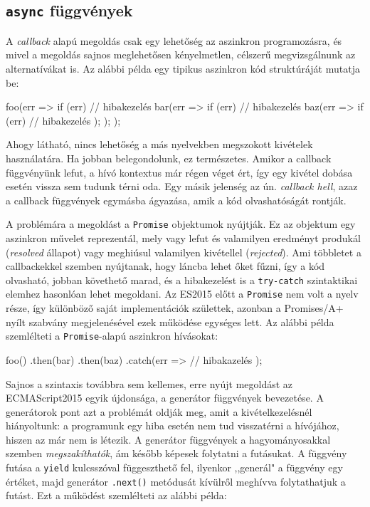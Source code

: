 \subsection{\texttt{async} függvények}\label{sec:async}

A \emph{callback} alapú megoldás csak egy lehetőség az aszinkron programozásra,
és mivel a megoldás sajnos meglehetősen kényelmetlen, célszerű megvizsgálnunk az
alternatívákat is. Az alábbi példa egy tipikus aszinkron kód struktúráját
mutatja be:

\begin{js}
foo(err => {
  if (err) {
    // hibakezelés
  }
  bar(err => {
    if (err) {
      // hibakezelés
    }
    baz(err => {
      if (err) {
        // hibakezelés
      }
    });
  });
});
\end{js}

Ahogy látható, nincs lehetőség a más nyelvekben megszokott kivételek
használatára.  Ha jobban belegondolunk, ez természetes. Amikor a callback
függvényünk lefut, a hívó kontextus már régen véget ért, így egy kivétel dobása
esetén vissza sem tudunk térni oda. Egy másik jelenség az ún. \emph{callback
  hell}, azaz a callback függvények egymásba ágyazása, amik a kód olvashatóságát
rontják.

A problémára a megoldást a \texttt{Promise} objektumok nyújtják.  Ez az objektum
egy aszinkron művelet reprezentál, mely vagy lefut és valamilyen eredményt
produkál (\emph{resolved} állapot) vagy meghiúsul valamilyen kivétellel
(\emph{rejected}).  Ami többletet a callbackekkel szemben nyújtanak, hogy láncba
lehet őket fűzni, így a kód olvasható, jobban követhető marad, és a hibakezelést
is a \texttt{try-catch} szintaktikai elemhez hasonlóan lehet megoldani. Az
ES2015 előtt a \texttt{Promise} nem volt a nyelv része, így különböző saját
implementációk születtek, azonban a Promises/A+\cite{promisesa} nyílt szabvány
megjelenésével ezek működése egységes lett. Az alábbi példa szemlélteti a
\texttt{Promise}-alapú aszinkron hívásokat:

\begin{js}
foo()
  .then(bar)
  .then(baz)
  .catch(err => {
    // hibakazelés
  });
\end{js}

Sajnos a szintaxis továbbra sem kellemes, erre nyújt megoldást az ECMAScript2015
egyik újdonsága, a generátor függvények bevezetése. A generátorok pont azt a
problémát oldják meg, amit a kivételkezelésnél hiányoltunk: a programunk egy
hiba esetén nem tud visszatérni a hívójához, hiszen az már nem is létezik.  A
generátor függvények a hagyományosakkal szemben \emph{megszakíthatók}, ám
később képesek folytatni a futásukat. A függvény futása a \texttt{yield}
kulcsszóval függeszthető fel, ilyenkor ,,generál" a függvény egy értéket, majd
generátor \texttt{.next()} metódusát kívülről meghívva folytathatjuk a futást.
Ezt a működést szemlélteti az alábbi példa:

